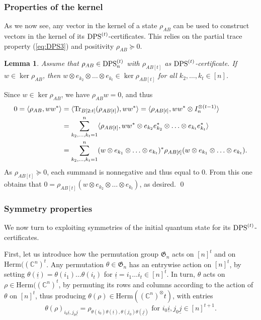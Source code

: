 \documentclass[11pt]{article}
\makeatletter
\newcommand{\C}{\ensuremath{\mathbb{C}}} %
\newcommand{\Perm}{\mathfrak G}
\newcommand{\Herm}{\mathrm{Herm}}
\newcommand{\DPS}{\text{\rm DPS}}
\newcommand{\Tr}{\text{\rm Tr}}
\newcommand{\ot}{\otimes}
\newcommand{\ui}{\underline{i}}
\newcommand{\uj}{\underline{j}}
\theoremstyle{plain}
\newtheorem{lemma}[satz]{Lemma}
\renewenvironment{proof}[1][\proofname]{%
  \par
  \pushQED{}%
  \normalfont
  \topsep6\p@\@plus6\p@
  \trivlist
  \item[\hskip\labelsep\itshape #1\@addpunct{.}]%
}{%
  \popQED
  \endtrivlist
}
\makeatother
\begin{document}
\subsubsection*{Properties of the kernel}
As we now see,  any vector in   the kernel  of a   state $\rho_{AB}$ can be used to construct vectors in the kernel of its $\DPS^{(t)}$-certificates. This relies on the partial trace property (\ref{eq:DPS3}) and positivity $\rho_{AB}\succeq 0$.

\begin{lemma}\label{lem:kernel-DPS}
Assume that $\rho_{AB}\in \DPS^{(t)}_n$ with $\rho_{AB[t]}$ as $\DPS^{(t)}$-certificate.
If $w\in \ker \rho_{AB}$, then $w\ot e_{k_2}\ot \ldots \ot e_{k_t}\in \ker \rho_{AB[t]}$ for all
$k_2,\ldots,k_t\in [n]$.
\end{lemma}

\begin{proof}
Since $w\in \ker \rho_{AB}$, we have $\rho_{AB}w=0$, and thus
\begin{align*}
 0=\langle \rho_{AB},ww^*\rangle & = \langle \Tr_{B[2:t]}(\rho_{AB[t]}), ww^*\rangle
=\langle \rho_{AB[t]}, ww^*\ot I_n^{\ot (t-1)}\rangle\\
& =\sum_{k_2,\ldots,k_t=1}^n \langle \rho_{AB[t]}, ww^*\ot e_{k_2}e_{k_2}^* \ot\ldots\ot e_{k_t}e_{k_t}^*\rangle\\
&= \sum_{k_2,\ldots,k_t=1}^n (w\ot e_{k_1}\ot\ldots\ot e_{k_t})^* \rho_{AB[t]} (w\ot e_{k_1}\ot\ldots\ot e_{k_t}).
\end{align*}
As $\rho_{AB[t]}\succeq 0$, each summand is nonnegative and thus equal to 0. From this one obtains that    $0=\rho_{AB[t]} (w \ot e_{k_2}\ot \ldots \ot e_{k_t})$, as desired.
\qed\end{proof}

\subsubsection*{Symmetry properties}


We now turn to exploiting symmetries of the initial quantum state for its $\DPS^{(t)}$-certificates.

First, let us introduce how the permutation group $\Perm_n$ acts on $[n]^t$ and   on $ \Herm((\C^n)^t$. 
Any permutation $\theta \in \Perm_n$ has an entrywise action on $[n]^t$, by setting
$\theta(\ui)=\theta(i_1)\ldots\theta(i_t)$ for $\ui=i_1\ldots i_t\in [n]^t$.
 In turn, $\theta$ acts on  $\rho\in \Herm((\C^n)^t$, by permuting its rows and columns according to the action of $\theta$ on $[n]^t$, thus producing  $\theta(\rho)\in \Herm((\C^n)^\ot t)$, with entries
 $$\theta(\rho)_{i_0\ui,j_0\uj}= \rho_{\theta(i_0) \theta(\ui),\theta(j_0)\theta(\uj)} \text{ for }
 i_0\ui,j_0\uj\in [n]^{t+1}.
 $$
\end{document}
